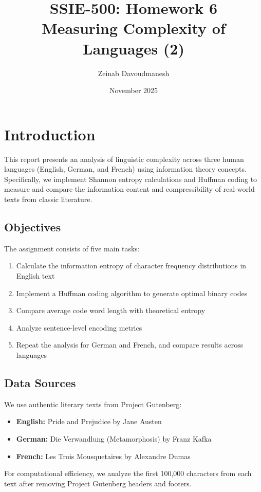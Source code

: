 \documentclass[11pt]{article}
\title{\textbf{SSIE-500: Homework 6} \\ Measuring Complexity of Languages (2)}
\author{Zeinab Davoudmanesh}
\date{November 2025}
\begin{document}
\maketitle

\section{Introduction}
This report presents an analysis of linguistic complexity across three human languages (English, German, and French) using information theory concepts. Specifically, we implement Shannon entropy calculations and Huffman coding to measure and compare the information content and compressibility of real-world texts from classic literature.

\subsection{Objectives}
The assignment consists of five main tasks:
\begin{enumerate}
    \item Calculate the information entropy of character frequency distributions in English text
    \item Implement a Huffman coding algorithm to generate optimal binary codes
    \item Compare average code word length with theoretical entropy
    \item Analyze sentence-level encoding metrics
    \item Repeat the analysis for German and French, and compare results across languages
\end{enumerate}

\subsection{Data Sources}
We use authentic literary texts from Project Gutenberg:
\begin{itemize}
    \item \textbf{English:} Pride and Prejudice by Jane Austen
    \item \textbf{German:} Die Verwandlung (Metamorphosis) by Franz Kafka
    \item \textbf{French:} Les Trois Mousquetaires by Alexandre Dumas
\end{itemize}
For computational efficiency, we analyze the first 100,000 characters from each text after removing Project Gutenberg headers and footers.
\end{document}
